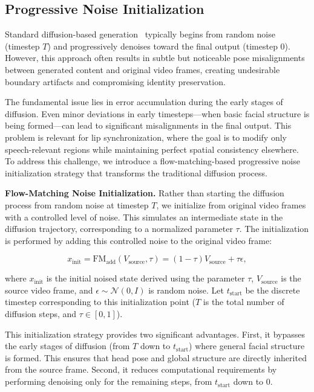 \subsection{Progressive Noise Initialization}
\vspace{-0.3em}
Standard diffusion-based generation~\cite{tian2024emo} typically begins from random noise (timestep $T$) and progressively denoises toward the final output (timestep $0$). However, this approach often results in subtle but noticeable pose misalignments between generated content and original video frames, creating undesirable boundary artifacts and compromising identity preservation.

The fundamental issue lies in error accumulation during the early stages of diffusion. Even minor deviations in early timesteps—when basic facial structure is being formed—can lead to significant misalignments in the final output. This problem is relevant for lip synchronization, where the goal is to modify only speech-relevant regions while maintaining perfect spatial consistency elsewhere.
To address this challenge, we introduce a flow-matching-based progressive noise initialization strategy that transforms the traditional diffusion process.

\textbf{Flow-Matching Noise Initialization.}
Rather than starting the diffusion process from random noise at timestep $T$, we initialize from original video frames with a controlled level of noise. This simulates an intermediate state in the diffusion trajectory, corresponding to a normalized parameter $\tau$. The initialization is performed by adding this controlled noise to the original video frame:

\vspace{-0.5em}
\begin{equation}
x_{\text{init}} = \text{FM}_{\text{add}}(V_{\text{source}}, \tau) = (1-\tau)V_{\text{source}}+ \tau\epsilon,
\label{eq:fm_add}
\end{equation}
\vspace{-0.5em}


where $x_{\text{init}}$ is the initial noised state derived using the parameter $\tau$, $V_{\text{source}}$ is the source video frame, and $\epsilon \sim \mathcal{N}(0, I)$ is random noise. Let $t_{\text{start}}$ be the discrete timestep corresponding to this initialization point ($T$ is the total number of diffusion steps, and $\tau \in [0,1]$).

This initialization strategy provides two significant advantages. First, it bypasses the early stages of diffusion (from $T$ down to $t_{\text{start}}$) where general facial structure is formed. This ensures that head pose and global structure are directly inherited from the source frame. Second, it reduces computational requirements by performing denoising only for the remaining steps, from $t_{\text{start}}$ down to $0$.


